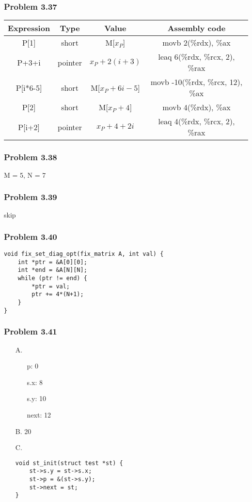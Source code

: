 \documentclass[a4paper]{article}
\begin{document}
\subsubsection*{Problem 3.37}
\begin{tabular}{cccc}
    Expression&Type&Value&Assembly code\\\hline
    P[1]&short&M[$x_P$]&movb 2(\%rdx), \%ax\\
    P+3+i&pointer&$x_P+2(i+3)$&leaq 6(\%rdx, \%rcx, 2), \%rax\\
    P[i*6-5]&short&M[$x_P+6i-5$]&movb -10(\%rdx, \%rcx, 12), \%ax\\
    P[2]&short&M[$x_P+4$]&movb 4(\%rdx), \%ax\\
    P[i+2]&pointer&$x_P+4+2i$&leaq 4(\%rdx, \%rcx, 2), \%rax
\end{tabular}

\subsubsection*{Problem 3.38}
M = 5, N = 7

\subsubsection*{Problem 3.39}
skip

\subsubsection*{Problem 3.40}
\begin{lstlisting}
void fix_set_diag_opt(fix_matrix A, int val) {
    int *ptr = &A[0][0];
    int *end = &A[N][N];
    while (ptr != end) {
        *ptr = val;
        ptr += 4*(N+1);
    }
}
\end{lstlisting}

\subsubsection*{Problem 3.41}
\begin{enumerate}
    \item [A.] 
    \begin{enumerate}
        \item [p:] 0
        \item [s.x:] 8
        \item [s.y:] 10
        \item [next:] 12
    \end{enumerate}
    \item [B.] 20
    \item [C.]
    \begin{lstlisting}
void st_init(struct test *st) {
    st->s.y = st->s.x;
    st->p = &(st->s.y);
    st->next = st;
}
    \end{lstlisting}
\end{enumerate}
\end{document}
